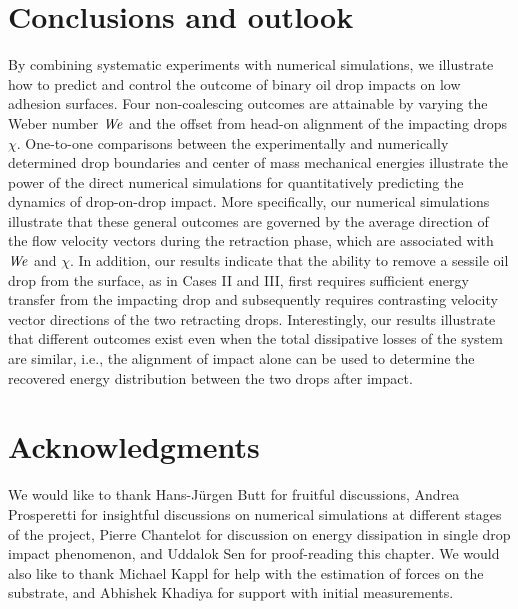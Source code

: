 \section{Conclusions and outlook}\label{Ch5:Conclusion}
By combining systematic experiments with numerical simulations, we illustrate how to predict and control the outcome of binary oil drop impacts on low adhesion surfaces. Four non-coalescing outcomes are attainable by varying the Weber number $\mathit{We}$ and the offset from head-on alignment of the impacting drops $\chi$. One-to-one comparisons between the experimentally and numerically determined drop boundaries and center of mass mechanical energies illustrate the power of the direct numerical simulations for quantitatively predicting the dynamics of drop-on-drop impact. More specifically, our numerical simulations illustrate that these general outcomes are governed by the average direction of the flow velocity vectors during the retraction phase, which are associated with $\mathit{We}$ and $\chi$. In addition, our results indicate that the ability to remove a sessile oil drop from the surface, as in Cases II and III, first requires sufficient energy transfer from the impacting drop and subsequently requires contrasting velocity vector directions of the two retracting drops. Interestingly, our results illustrate that different outcomes exist even when the total dissipative losses of the system are similar, i.e., the alignment of impact alone can be used to determine the recovered energy distribution between the two drops after impact.

\section*{Acknowledgments}
We would like to thank Hans-J{\"u}rgen Butt for fruitful discussions, Andrea Prosperetti for insightful discussions on numerical simulations at different stages of the project, Pierre Chantelot for discussion on energy dissipation in single drop impact phenomenon, and Uddalok Sen for proof-reading this chapter. We would also like to thank Michael Kappl for help with the estimation of forces on the substrate, and Abhishek Khadiya for support with initial measurements. 

